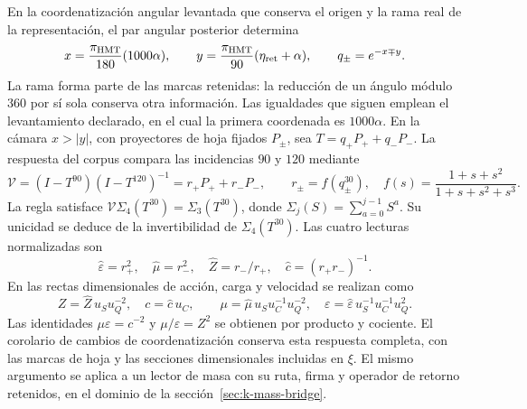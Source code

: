 En la coordenatización angular levantada que conserva el origen y la rama real
de la representación, el par angular posterior determina
\[
 x=\frac{\pi_{\rm HMT}}{180}(1000\alpha),\qquad
 y=\frac{\pi_{\rm HMT}}{90}(\eta_{\rm ret}+\alpha),\qquad
 q_\pm=e^{-x\mp y}.
\]
La rama forma parte de las marcas retenidas: la reducción de un ángulo
módulo \(360\) por sí sola conserva otra información. Las igualdades
que siguen emplean el levantamiento declarado, en el cual la primera
coordenada es \(1000\alpha\).
En la cámara \(x>|y|\), con proyectores de hoja fijados
\(P_\pm\), sea \(T=q_+P_++q_-P_-\). La respuesta del corpus
compara las incidencias \(90\) y \(120\) mediante
\[
 \mathcal V=(I-T^{90})(I-T^{120})^{-1}
 =r_+P_++r_-P_-,\qquad
 r_\pm=f(q_\pm^{30}),\quad
 f(s)=\frac{1+s+s^2}{1+s+s^2+s^3}.
\]
La regla satisface
\(\mathcal V\Sigma_4(T^{30})=\Sigma_3(T^{30})\), donde
\(\Sigma_j(S)=\sum_{a=0}^{j-1}S^a\). Su unicidad se deduce
de la invertibilidad de \(\Sigma_4(T^{30})\).
Las cuatro lecturas normalizadas son
\[
 \widehat\varepsilon=r_+^2,\quad
 \widehat\mu=r_-^2,\quad
 \widehat Z=r_-/r_+,\quad
 \widehat c=(r_+r_-)^{-1}.
\]
En las rectas dimensionales de acción, carga y velocidad se realizan como
\[
 Z=\widehat Z\,u_Su_Q^{-2},\quad c=\widehat c\,u_C,
 \qquad
 \mu=\widehat\mu\,u_Su_C^{-1}u_Q^{-2},\quad
 \varepsilon=\widehat\varepsilon\,u_S^{-1}u_C^{-1}u_Q^2.
\]
Las identidades \(\mu\varepsilon=c^{-2}\) y
\(\mu/\varepsilon=Z^2\) se obtienen por producto y cociente.
El corolario de cambios de coordenatización conserva esta respuesta completa,
con las marcas de hoja y las secciones dimensionales incluidas en
\(\xi\). El mismo argumento se aplica a un lector de masa con su
ruta, firma y operador de retorno retenidos, en el dominio de la
sección~\ref{sec:k-mass-bridge}.

